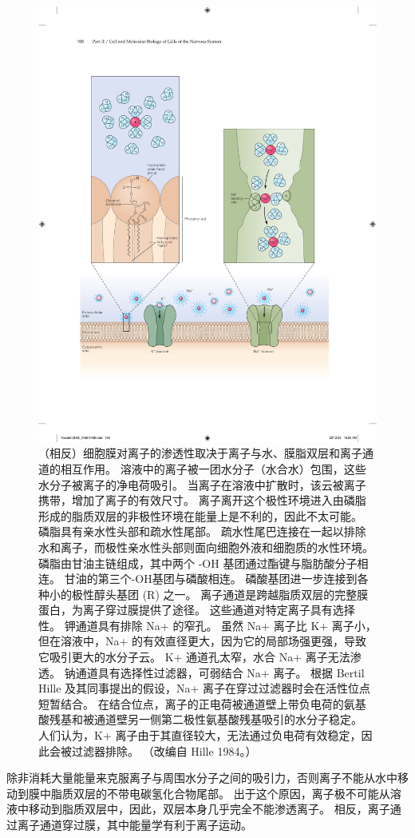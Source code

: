 \begin{figure}[htbp]
	\centering
	\includegraphics[width=0.6\linewidth]{chap08/fig_8_1}
	\caption{（相反）细胞膜对离子的渗透性取决于离子与水、膜脂双层和离子通道的相互作用。 溶液中的离子被一团水分子（水合水）包围，这些水分子被离子的净电荷吸引。 当离子在溶液中扩散时，该云被离子携带，增加了离子的有效尺寸。 离子离开这个极性环境进入由磷脂形成的脂质双层的非极性环境在能量上是不利的，因此不太可能。 磷脂具有亲水性头部和疏水性尾部。 疏水性尾巴连接在一起以排除水和离子，而极性亲水性头部则面向细胞外液和细胞质的水性环境。 磷脂由甘油主链组成，其中两个 -OH 基团通过酯键与脂肪酸分子相连。 甘油的第三个-OH基团与磷酸相连。 磷酸基团进一步连接到各种小的极性醇头基团 (R) 之一。 离子通道是跨越脂质双层的完整膜蛋白，为离子穿过膜提供了途径。 这些通道对特定离子具有选择性。 钾通道具有排除 Na+ 的窄孔。 虽然 Na+ 离子比 K+ 离子小，但在溶液中，Na+ 的有效直径更大，因为它的局部场强更强，导致它吸引更大的水分子云。 K+ 通道孔太窄，水合 Na+ 离子无法渗透。 钠通道具有选择性过滤器，可弱结合 Na+ 离子。 根据 Bertil Hille 及其同事提出的假设，Na+ 离子在穿过过滤器时会在活性位点短暂结合。 在结合位点，离子的正电荷被通道壁上带负电荷的氨基酸残基和被通道壁另一侧第二极性氨基酸残基吸引的水分子稳定。 人们认为，K+ 离子由于其直径较大，无法通过负电荷有效稳定，因此会被过滤器排除。 （改编自 Hille 1984。）}
	\label{fig:8_1}
\end{figure}


除非消耗大量能量来克服离子与周围水分子之间的吸引力，否则离子不能从水中移动到膜中脂质双层的不带电碳氢化合物尾部。 
出于这个原因，离子极不可能从溶液中移动到脂质双层中，因此，双层本身几乎完全不能渗透离子。 
相反，离子通过离子通道穿过膜，其中能量学有利于离子运动。


